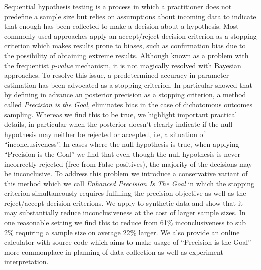 Sequential hypothesis testing is a process in which a practitioner does not predefine a
sample size but relies on assumptions about incoming data to indicate that enough has
been collected to make a decision about a hypothesis. Most commonly used approaches
apply an accept/reject decision criterion as a stopping criterion which makes results
prone to biases, such as confirmation bias due to the possibility of obtaining extreme
results. Although known as a problem with the frequentist {\it p-value} mechanism, it is not
magically resolved with Bayesian approaches. To resolve this issue, a predetermined
accuracy in parameter estimation has been advocated as a stopping criterion.
In particular \cite{kruschke2015doing} showed that by defining in advance an  posterior precision as
a stopping criterion, a method called {\it Precision is the Goal}, eliminates bias in the
case of dichotomous outcomes sampling. Whereas we find this to be true, we highlight
important practical details, in particular when the posterior doesn’t clearly indicate
if the null hypothesis may neither be rejected or accepted, i.e, a situation of
“inconclusiveness”. In cases where the null hypothesis is true, when applying
“Precision is the Goal” we find that even though the null hypothesis is never
incorrectly rejected (free from False positives), the majority of the decisions may
be inconclusive. 
To address this problem we introduce a conservative variant of this method which we call
{\it Enhanced Precision Is The Goal} in which the stopping criterion simultaneously
requires fulfilling the precision objective as well as the
reject/accept decision criterions. We apply to synthetic  data and show that it may
substantially reduce inconclusiveness at the cost of larger sample sizes. In one
reasonable setting we find this to reduce from 61\% inconclusiveness to sub 2\%
requiring a sample size on average 22\% larger. 
We also provide an online calculator with source code which aims to make usage of
“Precision is the Goal'' more commonplace in planning of data collection as well as
experiment interpretation.

